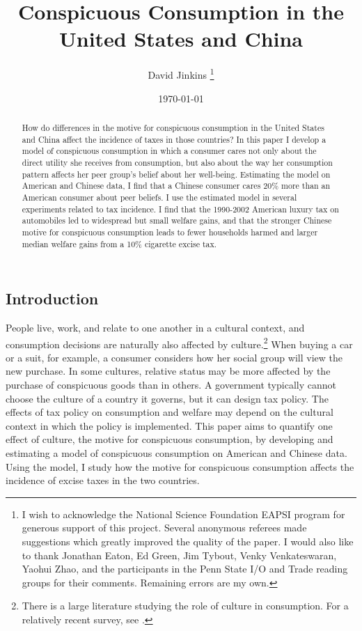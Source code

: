 \documentclass[11pt]{article}
\title{Conspicuous Consumption in the United States and China}
\author{David Jinkins \thanks{I wish to acknowledge the National Science Foundation EAPSI program for generous support of this project.  Several anonymous referees made suggestions which greatly improved the quality of the paper.  I would also like to thank Jonathan Eaton, Ed Green, Jim Tybout, Venky Venkateswaran, Yaohui Zhao, and the participants in the Penn State I/O and Trade reading groups for their comments. Remaining errors are my own.}}
\affil{
{\footnotesize Department of Economics     }\\
{\footnotesize Copenhagen Business School  }\\
{\footnotesize david.jinkins@gmail.com     }\\
{\footnotesize Tel: +45 38155658}}
\date{\today}
\begin{document}
\begin{CJK}{UTF8}{gbsn}
\maketitle

\begin{abstract}

How do differences in the motive for conspicuous consumption in the United States and China affect the incidence of taxes in those countries?  In this paper I develop a model of conspicuous consumption in which a consumer cares not only about the direct utility she receives from consumption, but also about the way her consumption pattern affects her peer group's belief about her well-being.  Estimating the model on American and Chinese data, I find that a Chinese consumer cares 20\% more than an American consumer about peer beliefs.  I use the estimated model in several experiments related to tax incidence.  I find that the 1990-2002 American luxury tax on automobiles led to widespread but small welfare gains, and that the stronger Chinese motive for conspicuous consumption leads to fewer households harmed and larger median welfare gains from a 10\% cigarette excise tax. \end{abstract}

\newpage

\section{Introduction}

People live, work, and relate to one another in a cultural context, and consumption decisions are naturally also affected by culture.\footnote{There is a large literature studying the role of culture in consumption.  For a relatively recent survey, see \citet{arnould2005consumer}.}  When buying a car or a suit, for example, a consumer considers how her social group will view the new purchase.  In some cultures, relative status may be more affected by the purchase of conspicuous goods than in others.  A government typically cannot choose the culture of a country it governs, but it can design tax policy.  The effects of tax policy on consumption and welfare may depend on the cultural context in which the policy is implemented.  This paper aims to quantify one effect of culture, the motive for conspicuous consumption, by developing and estimating a model of conspicuous consumption on American and Chinese data.  Using the model, I study how the motive for conspicuous consumption affects the incidence of excise taxes in the two countries.


\end{CJK}
\end{document}

